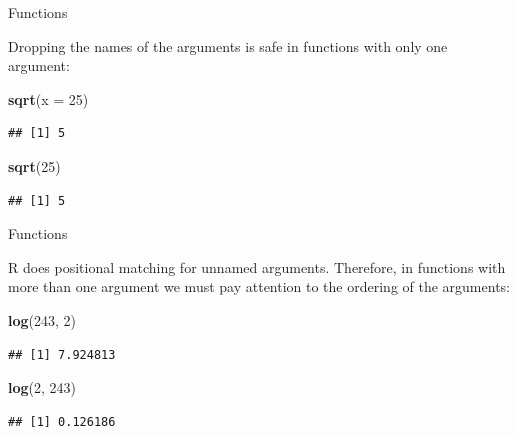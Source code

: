 \documentclass[ignorenonframetext,]{beamer}
\newenvironment{Shaded}{\begin{snugshade}}{\end{snugshade}}
\newcommand{\DataTypeTok}[1]{\textcolor[rgb]{0.13,0.29,0.53}{#1}}
\newcommand{\DecValTok}[1]{\textcolor[rgb]{0.00,0.00,0.81}{#1}}
\newcommand{\KeywordTok}[1]{\textcolor[rgb]{0.13,0.29,0.53}{\textbf{#1}}}
\newcommand{\NormalTok}[1]{#1}
\begin{document}
\begin{frame}[fragile]{Functions}
\protect\hypertarget{functions-6}{}

Dropping the names of the arguments is safe in functions with only one
argument:

\begin{Shaded}
\begin{Highlighting}[]
\KeywordTok{sqrt}\NormalTok{(}\DataTypeTok{x =} \DecValTok{25}\NormalTok{)}
\end{Highlighting}
\end{Shaded}

\begin{verbatim}
## [1] 5
\end{verbatim}

\begin{Shaded}
\begin{Highlighting}[]
\KeywordTok{sqrt}\NormalTok{(}\DecValTok{25}\NormalTok{)}
\end{Highlighting}
\end{Shaded}

\begin{verbatim}
## [1] 5
\end{verbatim}

\end{frame}

\begin{frame}[fragile]{Functions}
\protect\hypertarget{functions-7}{}

R does positional matching for unnamed arguments. Therefore, in
functions with more than one argument we must pay attention to the
ordering of the arguments:

\begin{Shaded}
\begin{Highlighting}[]
\KeywordTok{log}\NormalTok{(}\DecValTok{243}\NormalTok{, }\DecValTok{2}\NormalTok{)}
\end{Highlighting}
\end{Shaded}

\begin{verbatim}
## [1] 7.924813
\end{verbatim}

\begin{Shaded}
\begin{Highlighting}[]
\KeywordTok{log}\NormalTok{(}\DecValTok{2}\NormalTok{, }\DecValTok{243}\NormalTok{)}
\end{Highlighting}
\end{Shaded}

\begin{verbatim}
## [1] 0.126186
\end{verbatim}

\end{frame}
\end{document}
